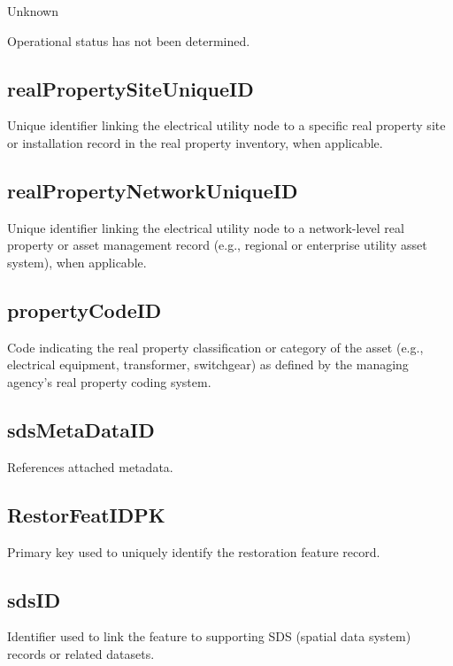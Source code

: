 \documentclass[
  letterpaper,
  DIV=11,
  numbers=noendperiod]{scrreprt}
\begin{document}
Unknown

Operational status has not been determined.

\subsection{realPropertySiteUniqueID}\label{realpropertysiteuniqueid}

Unique identifier linking the electrical utility node to a specific real
property site or installation record in the real property inventory,
when applicable.

\subsection{realPropertyNetworkUniqueID}\label{realpropertynetworkuniqueid}

Unique identifier linking the electrical utility node to a network-level
real property or asset management record (e.g., regional or enterprise
utility asset system), when applicable.

\subsection{propertyCodeID}\label{propertycodeid}

Code indicating the real property classification or category of the
asset (e.g., electrical equipment, transformer, switchgear) as defined
by the managing agency's real property coding system.

\subsection{sdsMetaDataID}\label{sdsmetadataid-19}

References attached metadata.

\subsection{RestorFeatIDPK}\label{restorfeatidpk-19}

Primary key used to uniquely identify the restoration feature record.

\subsection{sdsID}\label{sdsid-19}

Identifier used to link the feature to supporting SDS (spatial data
system) records or related datasets.
\end{document}
